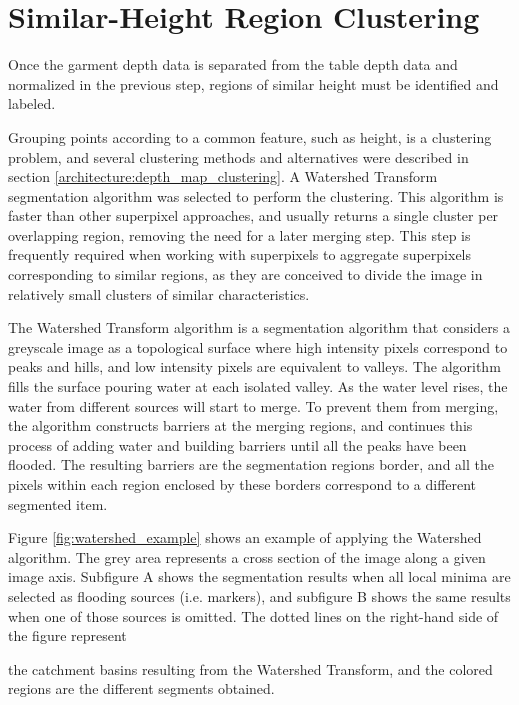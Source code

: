 \section{Similar-Height Region Clustering}
\label{garment_clustering_watershed}

Once the garment depth data is separated from the table depth data and normalized in the previous step, regions of similar height must be identified and labeled.

Grouping points according to a common feature, such as height, is a clustering problem, and several clustering methods and alternatives were described in section \ref{architecture:depth_map_clustering}. A Watershed Transform \cite{digabel1978iterative} segmentation algorithm was selected to perform the clustering. This algorithm is faster than other superpixel approaches, and usually returns a single cluster per overlapping region, removing the need for a later merging step. This step is frequently required when working with superpixels to aggregate superpixels corresponding to similar regions, as they are conceived to divide the image in relatively small clusters of similar characteristics.

The Watershed Transform algorithm is a segmentation algorithm that considers a greyscale image as a topological surface where high intensity pixels correspond to peaks and hills, and low intensity pixels are equivalent to valleys. The algorithm fills the surface pouring water at each isolated valley. As the water level rises, the water from different sources will start to merge. To prevent them from merging, the algorithm constructs barriers at the merging regions, and continues this process of adding water and building barriers until all the peaks have been flooded. The resulting barriers are the segmentation regions border, and all the pixels within each region enclosed  by these borders correspond to a different segmented item. 

Figure \ref{fig:watershed_example} shows an example of applying the Watershed algorithm. The grey area represents a cross section of the image along a given image axis. Subfigure A shows the segmentation results when all local minima are selected as flooding sources (i.e. markers), and subfigure B shows the same results when one of those sources is omitted. The dotted lines on the right-hand side of the figure represent \pagebreak

\noindent the catchment basins resulting from the Watershed Transform, and the colored regions are the different segments obtained.

